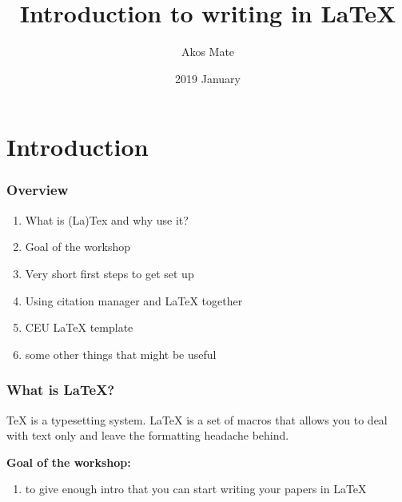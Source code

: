 \documentclass{beamer}
\title{Introduction to writing in LaTeX}
\author{Akos Mate}
\institute{Central European University}
\date{2019 January}
\begin{document}
\frame{\titlepage}

\section{Introduction}


\begin{frame}
	\frametitle{Overview}
	\begin{enumerate}
		\item What is (La)Tex and why use it?
		\item Goal of the workshop
		\item Very short first steps to get set up
		\item Using citation manager and LaTeX together
		\item CEU LaTeX template
		\item some other things that might be useful
	\end{enumerate}
\end{frame}



\begin{frame}
\frametitle{What is LaTeX?}
	TeX is a typesetting system. LaTeX is a set of macros that allows you to deal with text only and leave the formatting headache behind. \pause
	\bigskip

	\textbf{Goal of the workshop:} \pause
	\begin{enumerate}
	\item to give enough intro that you can start writing your papers in LaTeX
	\end{enumerate}
\end{frame}

\end{document}
